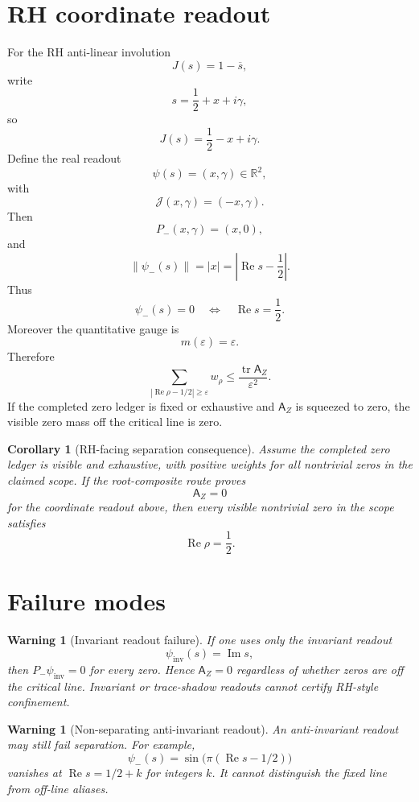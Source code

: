 \documentclass[11pt]{article}
\newtheorem{corollary}[theorem]{Corollary}
\newtheorem{warning}[theorem]{Warning}
\newcommand{\Tr}{\operatorname{tr}}
\newcommand{\bbR}{\mathbb R}
\begin{document}
\section{RH coordinate readout}
For the RH anti-linear involution
\[
  J(s)=1-\overline{s},
\]
write
\[
  s=\frac12+x+i\gamma,
\]
so
\[
  J(s)=\frac12-x+i\gamma.
\]
Define the real readout
\[
  \psi(s)=(x,\gamma)\in\bbR^2,
\]
with
\[
  \mathcal J(x,\gamma)=(-x,\gamma).
\]
Then
\[
  P_-(x,\gamma)=(x,0),
\]
and
\[
  \|\psi_-(s)\|=|x|=\left|\operatorname{Re}s-\frac12\right|.
\]
Thus
\[
  \psi_-(s)=0\quad\Longleftrightarrow\quad \operatorname{Re}s=\frac12.
\]
Moreover the quantitative gauge is
\[
  m(\varepsilon)=\varepsilon.
\]
Therefore
\[
  \sum_{\left|\operatorname{Re}\rho-1/2\right|\ge\varepsilon} w_\rho
  \le
  \frac{\Tr\mathsf A_Z}{\varepsilon^2}.
\]
If the completed zero ledger is fixed or exhaustive and $\mathsf A_Z$ is squeezed to zero, the visible zero mass off the critical line is zero.

\begin{corollary}[RH-facing separation consequence]
Assume the completed zero ledger is visible and exhaustive, with positive weights for all nontrivial zeros in the claimed scope.  If the root-composite route proves
\[
  \mathsf A_Z=0
\]
for the coordinate readout above, then every visible nontrivial zero in the scope satisfies
\[
  \operatorname{Re}\rho=\frac12.
\]
\end{corollary}

\section{Failure modes}
\begin{warning}[Invariant readout failure]
If one uses only the invariant readout
\[
  \psi_{\mathrm{inv}}(s)=\operatorname{Im}s,
\]
then $P_-\psi_{\mathrm{inv}}=0$ for every zero.  Hence $\mathsf A_Z=0$ regardless of whether zeros are off the critical line.  Invariant or trace-shadow readouts cannot certify RH-style confinement.
\end{warning}

\begin{warning}[Non-separating anti-invariant readout]
An anti-invariant readout may still fail separation.  For example,
\[
  \psi_-(s)=\sin\bigl(\pi(\operatorname{Re}s-1/2)\bigr)
\]
vanishes at $\operatorname{Re}s=1/2+k$ for integers $k$.  It cannot distinguish the fixed line from off-line aliases.
\end{warning}
\end{document}
